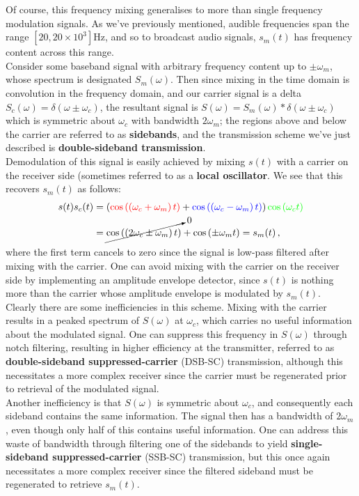 Of course, this frequency mixing generalises to more than single
frequency modulation signals. As we've previously mentioned, audible frequencies
span the range $[20,20\times 10 ^3]$Hz, and so to broadcast audio signals,
$s_m(t)$ has frequency content across this range.\\
%
Consider some baseband signal with arbitrary frequency content up to
$\pm\omega_m$, whose spectrum is designated $S_m(\omega)$. Then
since mixing in the time domain is convolution in the frequency domain, and our
carrier signal is a delta $S_c(\omega) = \delta(\omega \pm \omega_c)$, the
resultant signal is $S(\omega) = S_m(\omega) \ast \delta(\omega \pm \omega_c)$
which is symmetric about $\omega_c$ with bandwidth $2\omega_m$; the regions
above and below the carrier are referred to as \textbf{sidebands}, and the
transmission scheme we've just described is
\textbf{double-sideband transmission}.\\
%
Demodulation of this signal is easily achieved by mixing $s(t)$ with a carrier
on the receiver side (sometimes referred to as a \textbf{local oscillator}. We
see that this recovers $s_m(t)$ as follows:
%
\begin{align*}
  s(t) s_c(t) &= \left(
    {\color{red}{\cos\left(\left(\omega_c + \omega_m\right) t\right)}} +
    {\color{blue}{\cos\left(\left(\omega_c - \omega_m\right) t\right)}}
  \right) {\color{green}{\cos\left(\omega_c t\right)}}\\
  &= \cancelto{0}{\cos\left(\left( 2\omega_c \pm \omega_m \right)t\right)} +
    \cos\left(\pm\omega_m t\right) = s_m(t) \,,
\end{align*}
%
where the first term cancels to zero since the signal is low-pass filtered after
mixing with the carrier. One can avoid mixing with the carrier on the receiver
side by implementing an amplitude envelope detector, since $s(t)$ is nothing
more than the carrier whose amplitude envelope is modulated by $s_m(t)$.\\

Clearly there are some inefficiencies in this scheme. Mixing with the carrier
results in a peaked spectrum of $S(\omega)$ at $\omega_c$, which carries no
useful information about the modulated signal. One can suppress this frequency
in $S(\omega)$ through notch filtering, resulting in higher efficiency at the
transmitter, referred to as
\textbf{double-sideband suppressed-carrier} (DSB-SC) transmission, although this
necessitates a more complex receiver since the carrier must be regenerated prior
to retrieval of the modulated signal.\\
%
Another inefficiency is that $S(\omega)$ is symmetric about $\omega_c$, and
consequently each sideband contains the same information. The signal then has a
bandwidth of $2\omega_m$, even though only half of this contains useful
information. One can address this waste of bandwidth through filtering one of
the sidebands to yield \textbf{single-sideband suppressed-carrier} (SSB-SC)
transmission, but this once again necessitates a more complex receiver since the
filtered sideband must be regenerated to retrieve $s_m(t)$.

